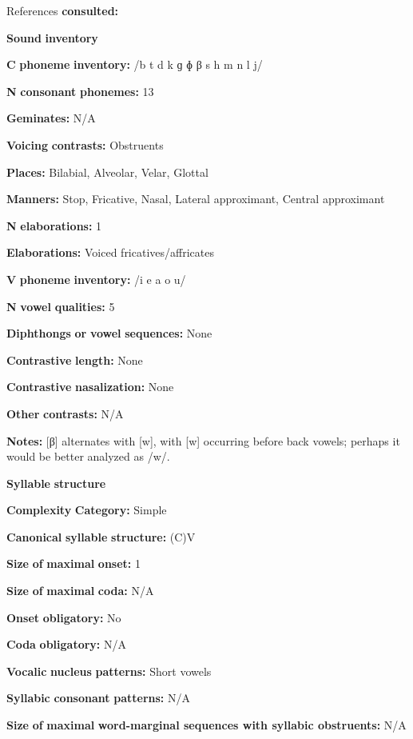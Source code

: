 \begin{styleBody}
References \textbf{consulted:} \citet{Dutton1996}

\textbf{Sound} \textbf{inventory}

\textbf{C} \textbf{phoneme} \textbf{inventory:} /b t d k ɡ ɸ β s h m n l j/

\textbf{N} \textbf{consonant} \textbf{phonemes:} 13

\textbf{Geminates:} N/A

\textbf{Voicing} \textbf{contrasts:} Obstruents

\textbf{Places:} Bilabial, Alveolar, Velar, Glottal

\textbf{Manners:} Stop, Fricative, Nasal, Lateral approximant, Central approximant

\textbf{N} \textbf{elaborations:} 1

\textbf{Elaborations:} Voiced fricatives/affricates

\textbf{V} \textbf{phoneme} \textbf{inventory:} /i e a o u/

\textbf{N} \textbf{vowel} \textbf{qualities:} 5

\textbf{Diphthongs} \textbf{or} \textbf{vowel} \textbf{sequences:} None

\textbf{Contrastive} \textbf{length:} None

\textbf{Contrastive} \textbf{nasalization:} None

\textbf{Other} \textbf{contrasts:} N/A

\textbf{Notes:} [β] alternates with [w], with [w] occurring before back vowels; perhaps it would be better analyzed as /w/.

\textbf{Syllable} \textbf{structure}

\textbf{Complexity} \textbf{Category:} Simple

\textbf{Canonical} \textbf{syllable} \textbf{structure:} (C)V \citep[7]{Dutton1996}

\textbf{Size} \textbf{of} \textbf{maximal} \textbf{onset:} 1

\textbf{Size} \textbf{of} \textbf{maximal} \textbf{coda:} N/A

\textbf{Onset} \textbf{obligatory:} No

\textbf{Coda} \textbf{obligatory:} N/A

\textbf{Vocalic} \textbf{nucleus} \textbf{patterns:} Short vowels

\textbf{Syllabic} \textbf{consonant} \textbf{patterns:} N/A

\textbf{Size} \textbf{of} \textbf{maximal} \textbf{word{}-marginal sequences with syllabic obstruents:} N/A


\end{styleBody}
